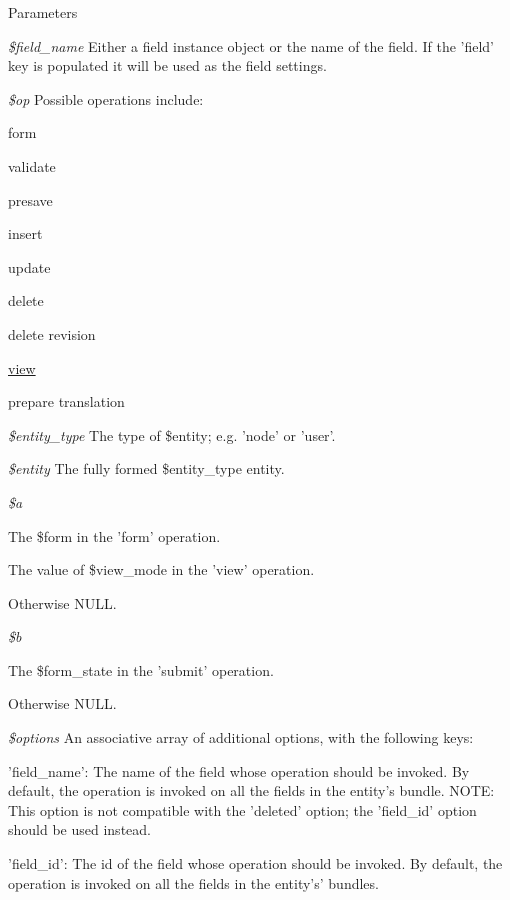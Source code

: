 \begin{DoxyParams}{Parameters}
\item[{\em \$field\_\-name}]Either a field instance object or the name of the field. If the 'field' key is populated it will be used as the field settings. \item[{\em \$op}]Possible operations include:
\begin{DoxyItemize}
\item form
\item validate
\item presave
\item insert
\item update
\item delete
\item delete revision
\item \hyperlink{classview}{view}
\item prepare translation 
\end{DoxyItemize}\item[{\em \$entity\_\-type}]The type of \$entity; e.g. 'node' or 'user'. \item[{\em \$entity}]The fully formed \$entity\_\-type entity. \item[{\em \$a}]
\begin{DoxyItemize}
\item The \$form in the 'form' operation.
\item The value of \$view\_\-mode in the 'view' operation.
\item Otherwise NULL. 
\end{DoxyItemize}\item[{\em \$b}]
\begin{DoxyItemize}
\item The \$form\_\-state in the 'submit' operation.
\item Otherwise NULL. 
\end{DoxyItemize}\item[{\em \$options}]An associative array of additional options, with the following keys:
\begin{DoxyItemize}
\item 'field\_\-name': The name of the field whose operation should be invoked. By default, the operation is invoked on all the fields in the entity's bundle. NOTE: This option is not compatible with the 'deleted' option; the 'field\_\-id' option should be used instead.
\item 'field\_\-id': The id of the field whose operation should be invoked. By default, the operation is invoked on all the fields in the entity's' bundles.

\end{DoxyItemize}
\end{DoxyParams}
